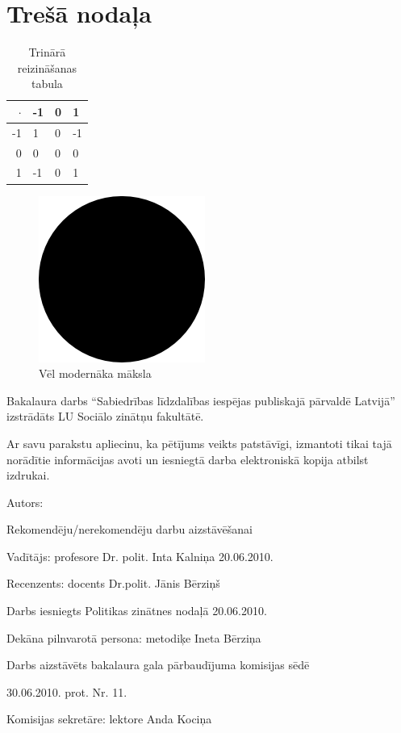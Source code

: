 \documentclass{LU-nosleguma}
\begin{document}
\section{Trešā nodaļa}

\begin{table}[!htbp]
	\caption{Trinārā reizināšanas tabula}
	\begin{tabular}{r | l | l | l |}
		$\cdot$  & -1 & 0 & 1\\ \hline
		-1 & 1 & 0 & -1\\ \hline
		0 & 0 & 0 & 0\\ \hline
		1 & -1 & 0 & 1\\ \hline
	\end{tabular}
\end{table}

\begin{figure}[!htbp]
	\includegraphics{such_art.png}
	\caption{Vēl modernāka māksla}
\end{figure}


\clearpage
{}

Bakalaura darbs ``Sabiedrības līdzdalības iespējas publiskajā pārvaldē Latvijā'' izstrādāts LU Sociālo zinātņu fakultātē. 

\vspace{18pt}

Ar savu parakstu apliecinu, ka pētījums veikts patstāvīgi, izmantoti tikai tajā norādītie informācijas avoti un iesniegtā darba elektroniskā kopija atbilst izdrukai.

Autors:\hspace{100pt}{Pēteris Cinis}

\vspace{54pt}

Rekomendēju/nerekomendēju darbu aizstāvēšanai

Vadītājs: profesore Dr. polit. Inta Kalniņa \hspace{100pt} 20.06.2010.

\vspace{36pt}

\noindent
Recenzents: docents Dr.polit. Jānis Bērziņš

\vspace{36pt}

Darbs iesniegts Politikas zinātnes nodaļā 20.06.2010.

Dekāna pilnvarotā persona: metodiķe Ineta Bērziņa

\vspace{72pt}

Darbs aizstāvēts bakalaura gala pārbaudījuma komisijas sēdē

30.06.2010. prot. Nr. 11. 

Komisijas sekretāre: lektore Anda Kociņa
\end{document}
